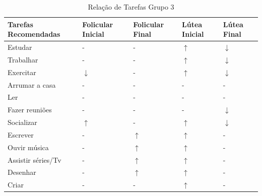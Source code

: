        \begin{table}[htbp]
            \centering
            \caption{Relação de Tarefas Grupo 3}
            \label{tab13}
            \begin{tabular}{p{5cm}p{1.8cm}p{1.8cm}p{1.8cm}p{1.8cm}}
                \toprule
                \textbf{Tarefas Recomendadas}  & \textbf{Folicular Inicial} & \textbf{Folicular Final}  & \textbf{Lútea Inicial}& \textbf{Lútea Final} \\ 
                \midrule
            Estudar & -  & - & $\uparrow$ & $\downarrow$ \\ 
            \midrule
            Trabalhar & - & -  & $\uparrow$ &  $\downarrow$  \\ 
            \midrule
            Exercitar & $\downarrow$ & -& $\uparrow$ &  $\downarrow$  \\ 
            \midrule
            Arrumar a casa  & - & -  & - & - \\ 
            \midrule
            Ler & - & -  & - & - \\ 
            \midrule
            Fazer reuniões & - & - & -& $\downarrow$ \\ 
            \midrule
            Socializar & $\uparrow$ & -  & $\uparrow$ & $\downarrow$ \\ 
            \midrule
            Escrever & - & $\uparrow$  & $\uparrow$ & - \\ 
            \midrule
            Ouvir música & - & $\uparrow$  & $\uparrow$  & -\\ 
            \midrule
            Assistir séries/Tv & - &  $\uparrow$ &  $\uparrow$ & - \\ 
            \midrule
            Desenhar & -  & $\uparrow$  & $\uparrow$ & - \\ 
            \midrule
            Criar & - &  -  &  $\uparrow$ & - \\ 
            \bottomrule    
            \end{tabular}
            \end{table}

